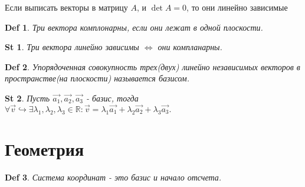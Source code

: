 \documentclass[a5paper, 10pt]{article}
\theoremstyle{plain}
\newtheorem*{statement}{St}
\newtheorem{definition}{Def}
\newcommand{\R}{\mathbb R}
\newcommand{\hrarrow}{\hookrightarrow}
\newcommand{\Lrarrow}{\Leftrightarrow}
\newcommand{\vec}{\overrightarrow}
\begin{document}
	Если выписать векторы в матрицу $ A $, и $ \det A = 0 $,
	то они линейно зависимые

	\begin{definition}
	Три вектора комплонарны, если они лежат в одной плоскости.
	\end{definition}

	\begin{statement}
	Три вектора линейно зависимы $ \Lrarrow $ они компланарны.
	\end{statement}

	\begin{definition}
	Упорядоченная совокупность трех(двух) линейно независимых векторов в пространстве(на плоскости)
	называется базисом.
	\end{definition}

	\begin{statement}
		Пусть $ \vec{a_1}, \vec{a_2}, \vec{a_3} $ - базис, тогда $ \forall \vec{v} \hrarrow \exists
		\lambda_1, \lambda_2, \lambda_3 \in \R: \vec{v} =
		\lambda_1 \vec{a_1} +
		\lambda_2 \vec{a_2} +
		\lambda_3 \vec{a_3}. $
	\end{statement}

	\section{Геометрия}

	\begin{definition}
	Система координат - это базис и начало отсчета.
	\end{definition}
\end{document}
